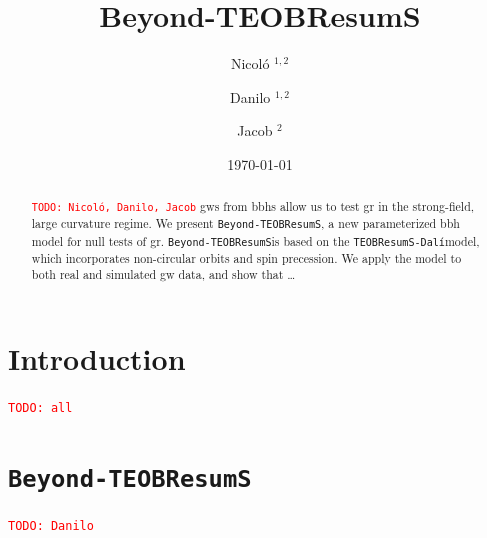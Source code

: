 \documentclass[prd,amssymb,amsmath,amsfonts,nofootinbib,reprint,showpacs,longbibliography]{revtex4-1}
\def\TEOBResumSDali{\texttt{TEOBResumS-Dalí}}
\def\TEOBB{\texttt{Beyond-TEOBResumS}}
\newcommand{\todo}[1]{\textcolor{red}{\texttt{TODO: #1}}}
\begin{document}
\title{Beyond-TEOBResumS}

\author{Nicol\'o ${}^{1,2}$}
\author{Danilo ${}^{1,2}$}
\author{Jacob ${}^{2}$}


\begin{abstract}
\todo{Nicol\'o, Danilo, Jacob}
\Acp{gw} from \acp{bbh} allow us to test \ac{gr} in the strong-field, large curvature regime.
We present \TEOBB, a new parameterized \ac{bbh} model for null tests of \ac{gr}.
\TEOBB is based on the \TEOBResumSDali model, which incorporates non-circular orbits and spin precession.
We apply the model to both real and simulated \ac{gw} data, and show that \dots
\end{abstract}

\date{\today}
\maketitle

\acresetall

\section{Introduction}
\todo{all}

\section{\TEOBB}
\todo{Danilo}
\end{document}
